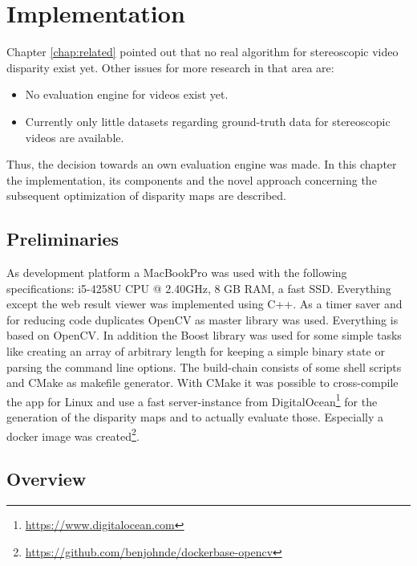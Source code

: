 \chapter{Implementation}
\label{chap:impl}

Chapter \ref{chap:related} pointed out that no real algorithm for stereoscopic video disparity exist yet.
Other issues for more research in that area are:

\begin{itemize}
  \item No evaluation engine for videos exist yet.
  \item Currently only little datasets regarding ground-truth data for stereoscopic videos are available.
\end{itemize}

\noindent Thus, the decision towards an own evaluation engine was made.
In this chapter the implementation, its components and the novel approach concerning the subsequent optimization of disparity maps are described.

\section{Preliminaries}

As development platform a MacBookPro was used with the following specifications: i5-4258U CPU @ 2.40GHz, 8 GB RAM, a fast SSD.
Everything except the web result viewer was implemented using C++.
As a timer saver and for reducing code duplicates OpenCV as master library was used.
Everything is based on OpenCV.
In addition the Boost library was used for some simple tasks like creating an array of arbitrary length for keeping a simple binary state or parsing the command line options.
The build-chain consists of some shell scripts and CMake as makefile generator.
With CMake it was possible to cross-compile the app for Linux and use a fast server-instance from DigitalOcean\footnote{\url{https://www.digitalocean.com}} for the generation of the disparity maps and to actually evaluate those.
\noindent Especially a docker image was created\footnote{\url{https://github.com/benjohnde/dockerbase-opencv}}.

\section{Overview}

